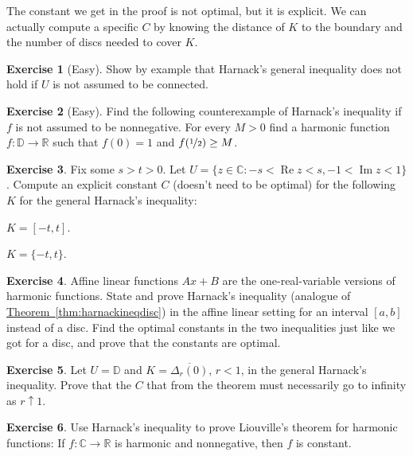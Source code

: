 \documentclass[12pt,openany]{book}
\renewcommand{\Re}{\operatorname{Re}}
\renewcommand{\Im}{\operatorname{Im}}
\newcommand{\C}{{\mathbb{C}}}
\newcommand{\R}{{\mathbb{R}}}
\newcommand{\D}{{\mathbb{D}}}
\theoremstyle{plain}
\theoremstyle{remark}
\theoremstyle{definition}
\newenvironment{exbox}{%
    \def\FrameCommand{\vrule width 1pt \relax\hspace{10pt}}%
    \MakeFramed{\advance\hsize-\width\FrameRestore}%
}{%
    \endMakeFramed
}
\newenvironment{expartshor}[1]{%
    \begingroup%
    \NumTabs{#1}%
    \leavevmode%
    \par%
    \begin{enumerate*}[a),itemjoin={\tab}]
}{%
    \end{enumerate*}\endgroup\par
}
\theoremstyle{exercise}
\newtheorem{exercise}{Exercise}[section]
\theoremstyle{example}
\newcommand{\thmref}[1]{\hyperref[#1]{Theorem~\ref*{#1}}}
\begin{document}
The constant we get in the proof is not optimal, but it is explicit.
We can actually compute a specific $C$ by knowing the distance of $K$
to the boundary and the number of discs needed to cover $K$.

\begin{exbox}
\begin{exercise}[Easy]
Show by example that Harnack's general inequality does not hold if $U$
is not assumed to be connected.
\end{exercise}

\begin{exercise}[Easy]
Find the following counterexample of Harnack's inequality
if $f$ is not assumed to be
nonnegative.  For every $M > 0$ find
a harmonic function $f \colon \D \to \R$ such that $f(0) = 1$ and
$f(\nicefrac{1}{2}) \geq M$.
\end{exercise}

\begin{exercise}
Fix some $s > t > 0$.
Let $U = \{z \in \C : -s < \Re z < s, -1 < \Im z < 1 \}$.
Compute an explicit constant $C$
(doesn't need to be optimal)
for the following $K$ for the general
Harnack's inequality:
\smallskip
\begin{expartshor}{2}
\item
$K = [-t,t]$.
\item
$K = \{-t,t\}$.
\end{expartshor}
\end{exercise}

\begin{exercise}
Affine linear functions $Ax+B$ are the one-real-variable
versions of harmonic functions.  State and prove Harnack's inequality
(analogue of \thmref{thm:harnackineqdisc})
in the affine linear setting for an interval $[a,b]$ instead of a disc.
Find the optimal constants in the two inequalities just like we got for a disc,
and prove that the constants are optimal.
\end{exercise}

\begin{exercise}
Let $U = \D$ and $K=\overline{\Delta_r(0)}$, $r < 1$, in the general 
Harnack's inequality.  Prove that the $C$ that from the theorem
must necessarily go to infinity as $r \uparrow 1$.
\end{exercise}

\begin{exercise}
Use Harnack's inequality to prove Liouville's theorem
for harmonic functions:
If $f \colon \C \to \R$ is harmonic
and nonnegative, then $f$ is constant.
\end{exercise}
\end{exbox}
\end{document}
